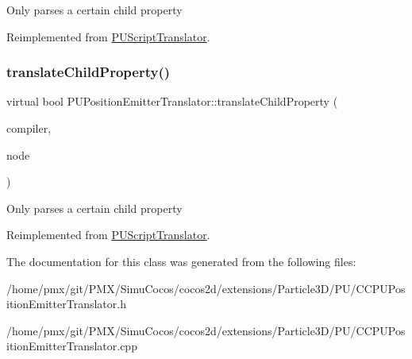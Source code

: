 Only parses a certain child property 

Reimplemented from \hyperlink{classPUScriptTranslator_a0374d83a8a04e57918975d525e0f8fe8}{P\+U\+Script\+Translator}.

\mbox{\label{classPUPositionEmitterTranslator_a62671a705fc0ba5288b5dc37512d216e}} 
\subsubsection{\texorpdfstring{translate\+Child\+Property()}{translateChildProperty()}\hspace{0.1cm}{\footnotesize\ttfamily [2/2]}}
{\footnotesize\ttfamily virtual bool P\+U\+Position\+Emitter\+Translator\+::translate\+Child\+Property (\begin{DoxyParamCaption}\item[{\hyperlink{classPUScriptCompiler}{P\+U\+Script\+Compiler} $\ast$}]{compiler,  }\item[{\hyperlink{classPUAbstractNode}{P\+U\+Abstract\+Node} $\ast$}]{node }\end{DoxyParamCaption})\hspace{0.3cm}{\ttfamily [virtual]}}

Only parses a certain child property 

Reimplemented from \hyperlink{classPUScriptTranslator_a0374d83a8a04e57918975d525e0f8fe8}{P\+U\+Script\+Translator}.



The documentation for this class was generated from the following files\+:\begin{DoxyCompactItemize}
\item 
/home/pmx/git/\+P\+M\+X/\+Simu\+Cocos/cocos2d/extensions/\+Particle3\+D/\+P\+U/C\+C\+P\+U\+Position\+Emitter\+Translator.\+h\item 
/home/pmx/git/\+P\+M\+X/\+Simu\+Cocos/cocos2d/extensions/\+Particle3\+D/\+P\+U/C\+C\+P\+U\+Position\+Emitter\+Translator.\+cpp\end{DoxyCompactItemize}
